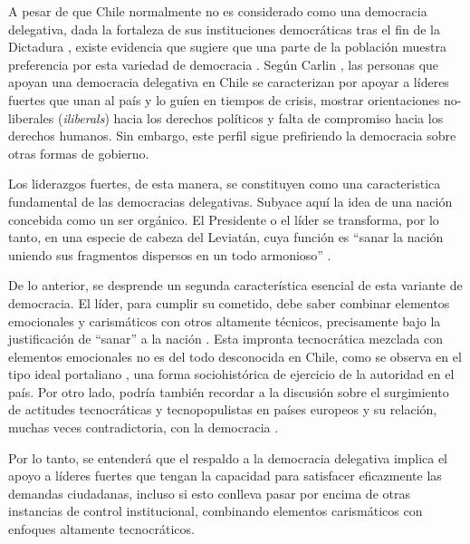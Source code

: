 \documentclass[12pt,twoside]{templates/facsothesis}
\begin{document}
A pesar de que Chile normalmente no es considerado como una democracia delegativa, dada la fortaleza de sus instituciones democráticas tras el fin de la Dictadura \citep{carlin2018, odonnell1994}, existe evidencia que sugiere que una parte de la población muestra preferencia por esta variedad de democracia \citep{carlin2011, carlin2018}. Según Carlin \citeyearpar{carlin2018}, las personas que apoyan una democracia delegativa en Chile se caracterizan por apoyar a líderes fuertes que unan al país y lo guíen en tiempos de crisis, mostrar orientaciones no-liberales (\emph{iliberals}) hacia los derechos políticos y falta de compromiso hacia los derechos humanos. Sin embargo, este perfil sigue prefiriendo la democracia sobre otras formas de gobierno.

Los liderazgos fuertes, de esta manera, se constituyen como una caracteristica fundamental de las democracias delegativas. Subyace aquí la idea de una nación concebida como un ser orgánico. El Presidente o el líder se transforma, por lo tanto, en una especie de cabeza del Leviatán, cuya función es ``sanar la nación uniendo sus fragmentos dispersos en un todo armonioso'' \citep[p.60]{odonnell1994}.

De lo anterior, se desprende un segunda característica esencial de esta variante de democracia. El líder, para cumplir su cometido, debe saber combinar elementos emocionales y carismáticos con otros altamente técnicos, precisamente bajo la justificación de ``sanar'' a la nación \citep{odonnell1994}. Esta impronta tecnocrática mezclada con elementos emocionales no es del todo desconocida en Chile, como se observa en el tipo ideal portaliano \citep{araujo2013}, una forma sociohistórica de ejercicio de la autoridad en el país. Por otro lado, podría también recordar a la discusión sobre el surgimiento de actitudes tecnocráticas y tecnopopulistas en países europeos y su relación, muchas veces contradictoria, con la democracia \citep{chiru2022, ganuza2020, pilet2023}.

Por lo tanto, se entenderá que el respaldo a la democracia delegativa implica el apoyo a líderes fuertes que tengan la capacidad para satisfacer eficazmente las demandas ciudadanas, incluso si esto conlleva pasar por encima de otras instancias de control institucional, combinando elementos carismáticos con enfoques altamente tecnocráticos.
\end{document}
